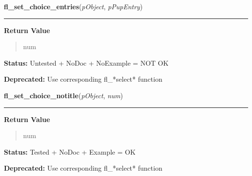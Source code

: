     \label{xformslib:deprecated:fl_set_choice_entries}

    \vspace{0.5ex}

\hspace{.8\funcindent}\begin{boxedminipage}{\funcwidth}

    \raggedright \textbf{fl\_set\_choice\_entries}(\textit{pObject}, \textit{pPupEntry})

    \vspace{-1.5ex}

    \rule{\textwidth}{0.5\fboxrule}
\setlength{\parskip}{2ex}
\setlength{\parskip}{1ex}
      \textbf{Return Value}
    \vspace{-1ex}

      \begin{quote}
      num

      \end{quote}

\textbf{Status:} Untested + NoDoc + NoExample = NOT OK



\textbf{Deprecated:} Use corresponding fl\_*select* function



    \end{boxedminipage}

    \label{xformslib:deprecated:fl_set_choice_notitle}

    \vspace{0.5ex}

\hspace{.8\funcindent}\begin{boxedminipage}{\funcwidth}

    \raggedright \textbf{fl\_set\_choice\_notitle}(\textit{pObject}, \textit{num})

    \vspace{-1.5ex}

    \rule{\textwidth}{0.5\fboxrule}
\setlength{\parskip}{2ex}
\setlength{\parskip}{1ex}
      \textbf{Return Value}
    \vspace{-1ex}

      \begin{quote}
      num

      \end{quote}

\textbf{Status:} Tested + NoDoc + Example = OK



\textbf{Deprecated:} Use corresponding fl\_*select* function



    \end{boxedminipage}

